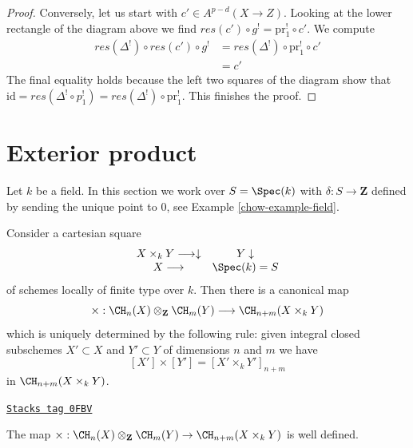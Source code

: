 \begin{proof}
\medskip\noindent
Conversely, let us start with $c' \in A^{p - d}(X \to Z)$. Looking
at the lower rectangle of the diagram above we find
$res(c') \circ g^! = \text{pr}_1^! \circ c'$.
We compute
\begin{align*}
res(\Delta^!) \circ res(c') \circ g^!
& =
res(\Delta^!) \circ \text{pr}_1^! \circ c' \\
& =
c'
\end{align*}
The final equality holds because the left two squares of
the diagram show that
$\text{id} = res(\Delta^! \circ p_1^!) = res(\Delta^!) \circ \text{pr}_1^!$.
This finishes the proof.
\end{proof}

\section{Exterior product}
\label{chow-section-exterior-product}
Let $k$ be a field. In this section we work over $S = \Spec(k)$ with
$\delta : S \to \mathbf{Z}$ defined by sending the unique point to $0$, see
Example \ref{chow-example-field}.

\medskip\noindent
Consider a cartesian square
$$
\begin{array}{cc}X \times_k Y \longrightarrow\downarrow & Y \downarrow \\ X \longrightarrow & \Spec(k) = S\end{array}
$$
of schemes locally of finite type over $k$. Then there is a canonical map
$$
\times :
\CH_n(X) \otimes_{\mathbf{Z}} \CH_m(Y)
\longrightarrow
\CH_{n + m}(X \times_k Y)
$$
which is uniquely determined by the following rule:
given integral closed subschemes $X' \subset X$
and $Y' \subset Y$ of dimensions $n$ and $m$ we have
$$
[X'] \times [Y'] = [X' \times_k Y']_{n + m}
$$
in $\CH_{n + m}(X \times_k Y)$.

\begin{lemma}
\label{chow-lemma-exterior-product-well-defined}
\href{https://stacks.math.columbia.edu/tag/0FBV}{\texttt{Stacks tag 0FBV}}

The map
$\times : \CH_n(X) \otimes_{\mathbf{Z}} \CH_m(Y) \to \CH_{n + m}(X \times_k Y)$
is well defined.
\end{lemma}

